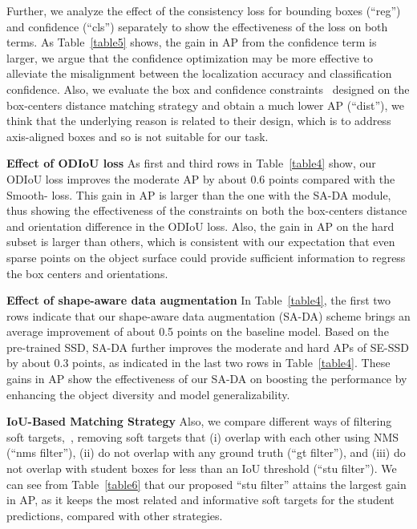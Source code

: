\documentclass[letterpaper]{article}
\begin{document}
Further, we analyze the effect of the consistency loss for bounding boxes (``reg'') and confidence  (``cls'') separately to show the effectiveness of the loss on both terms.
As Table~\ref{table5} shows, the gain in AP from the confidence term is larger, we argue that the confidence optimization may be more effective to alleviate the misalignment between the localization accuracy and classification confidence.
Also, we evaluate the box and confidence constraints~\cite{zhao2020sess} designed on the box-centers distance matching strategy and obtain a much lower AP (``dist''), we think that the underlying reason is related to their design, which is to address axis-aligned boxes and so is not suitable for our task.


\textbf{Effect of ODIoU loss}
As first and third rows in Table~\ref{table4} show, our ODIoU loss improves the moderate AP by about 0.6 points compared with the Smooth- loss.
This gain in AP is larger than the one with the SA-DA module, thus showing the effectiveness of the constraints on both the box-centers distance and orientation difference in the ODIoU loss.
Also, the gain in AP on the hard subset is larger than others, which is consistent with our expectation that even sparse points on the object surface could provide sufficient information to regress the box centers and orientations.


\textbf{Effect of shape-aware data augmentation}
In Table~\ref{table4}, the first two rows indicate that our shape-aware data augmentation (SA-DA) scheme brings an average improvement of about 0.5 points on the baseline model.
Based on the pre-trained SSD,  SA-DA further improves the moderate and hard APs of SE-SSD by about 0.3 points, as indicated in the last two rows in Table~\ref{table4}.
These gains in AP show the effectiveness of our SA-DA on boosting the performance by enhancing the object diversity and model generalizability.


\textbf{IoU-Based Matching Strategy}
Also, we compare different ways of filtering soft targets,~\ie, removing soft targets that
(i) overlap with each other using NMS (``nms filter''),
(ii) do not overlap with any ground truth (``gt filter''), and
(iii) do not overlap with student boxes for less than an IoU threshold (``stu filter'').
We can see from Table~\ref{table6} that our proposed ``stu filter'' attains the largest gain in AP, as it keeps the most related and informative soft targets for the student predictions, compared with other strategies.
\end{document}
